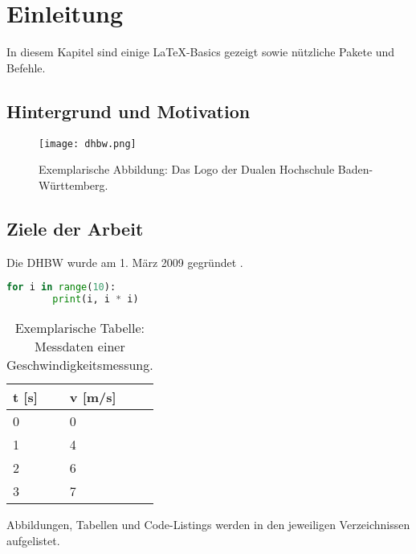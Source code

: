 
\chapter{Einleitung}

In diesem Kapitel sind einige LaTeX-Basics gezeigt sowie nützliche Pakete und Befehle.

\section{Hintergrund und Motivation}

\begin{figure}[ht]
    \centering
    \texttt{[image: dhbw.png]}
    \caption{Exemplarische Abbildung: Das Logo der Dualen Hochschule Baden-Württemberg.}
\end{figure}

\section{Ziele der Arbeit}

Die \ac{DHBW} wurde am 1. März 2009 gegründet \cite{DHBW-wirueberuns}.

\begin{minipage}{\linewidth}
    \begin{lstlisting}[language=Python, caption={Exemplarisches Code-Listing: Einfache for-Schleife mit Konsolenausgabe.}]
    for i in range(10):
        print(i, i * i)
    \end{lstlisting}
\end{minipage}

\begin{table}[ht]
    \centering
    \begin{tabular}{|l|l|}
        \hline
        t {[}s{]} & v {[}m/s{]} \\ \hline
        0         & 0           \\ \hline
        1         & 4           \\ \hline
        2         & 6           \\ \hline
        3         & 7           \\ \hline
    \end{tabular}
    \caption{Exemplarische Tabelle: Messdaten einer Geschwindigkeitsmessung.}
\end{table}

Abbildungen, Tabellen und Code-Listings werden in den jeweiligen Verzeichnissen aufgelistet.

